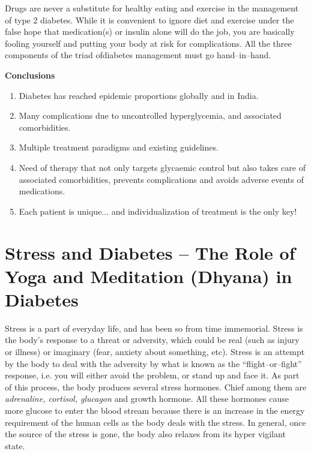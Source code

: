 Drugs are never a substitute for healthy eating and exercise in the management of type 2 diabetes. While it is convenient to ignore diet and exercise under the false hope that medication(s) or insulin alone will do the job, you are basically fooling yourself and putting your body at risk for complications. All the three components of the triad of\break diabetes management must go hand–in–hand.

\vskip 6pt

\noindent\textbf{Conclusions}

\begin{enumerate}[•]
\itemsep=0pt
\item Diabetes has reached epidemic proportions globally and in India.
\item Many complications due to uncontrolled hyperglycemia, and asso\-ciated comorbidities.
\item Multiple treatment paradigms and existing guidelines.
\item Need of therapy that not only targets glycaemic control but also takes care of associated comorbidities, prevents complications and avoids adverse events of medications.
\item Each patient is unique... and individualization of treatment is the only key!
\end{enumerate}


\chapter{Stress and Diabetes – The Role of Yoga and Meditation (Dhyana) in Diabetes}\label{chap27}

Stress is a part of everyday life, and has been so from time immemorial. Stress is the body’s response to a threat or adversity, which could be real (such as injury or illness) or imaginary (fear, anxiety about something, etc). Stress is an attempt by the body to deal with the adversity by what is known as the “flight–or–fight” response, i.e. you will either avoid the problem, or stand up and face it. As part of this process, the body produces several stress hormones. Chief among them are \textit{adrenaline, cortisol, glucagon} and growth hormone. All these hormones cause more glucose to enter the blood stream because there is an increase in the energy requirement of the human cells as the body deals with the stress. In general, once the source of the stress is gone, the body also relaxes from its hyper vigilant state.

